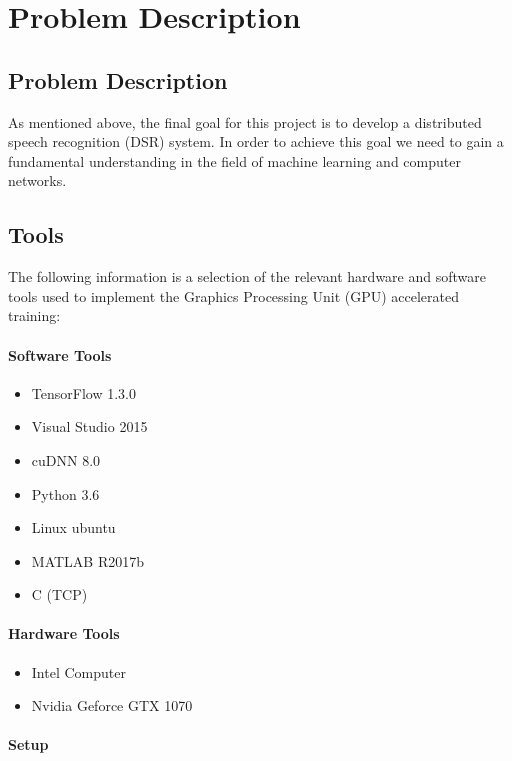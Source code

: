 \chapter{Problem Description}\label{ch:problem_description}
\section{Problem Description}

As mentioned above, the final goal for this project is to develop a distributed speech recognition (DSR) system.
In order to achieve this goal we need to gain a fundamental understanding in the field of machine learning and computer networks.

\section{Tools}
The following information is a selection of the relevant hardware and software tools used to implement the Graphics Processing Unit (GPU) accelerated training:
\subsubsection{Software Tools}
\begin{itemize}
	\item TensorFlow 1.3.0
	\item Visual Studio 2015
	\item cuDNN 8.0
	\item Python 3.6
	\item Linux ubuntu
	\item MATLAB  R2017b
	\item C (TCP)
\end{itemize}

\subsubsection{Hardware Tools}
\begin{itemize}
	\item Intel Computer
	\item Nvidia Geforce GTX 1070 
\end{itemize}

\subsubsection{Setup}

